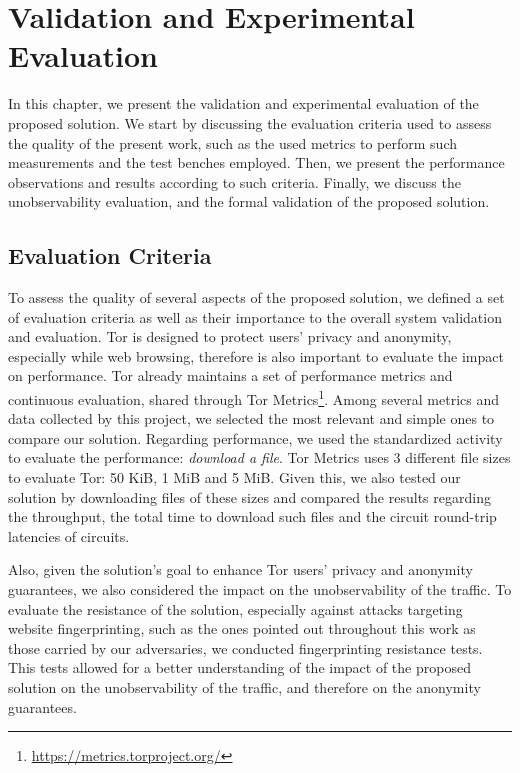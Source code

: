 
%

\chapter{Validation and Experimental Evaluation}\label{cha:validation}

In this chapter, we present the validation and experimental evaluation of the proposed solution. We start by discussing the evaluation criteria used to assess the quality of the present work, such as the used metrics to perform such measurements and the test benches employed. Then, we present the performance observations and results according to such criteria. 
Finally, we discuss the unobservability evaluation, and the formal validation of the proposed solution.

\section{Evaluation Criteria}\label{sec:evaluation_criteria}
To assess the quality of several aspects of the proposed solution, we defined a set of evaluation criteria as well as their importance to the overall system validation and evaluation. Tor is designed to protect users' privacy and anonymity, especially while web browsing, therefore is also important to evaluate the impact on performance. Tor already maintains a set of performance metrics and continuous evaluation, shared through Tor Metrics\footnote{\url{https://metrics.torproject.org/}}. Among several metrics and data collected by this project, we selected the most relevant and simple ones to compare our solution. Regarding performance, we used the standardized activity to evaluate the performance: \textit{download a file}. Tor Metrics uses 3 different file sizes to evaluate Tor: 50 KiB, 1 MiB and 5 MiB. Given this, we also tested our solution by downloading files of these sizes and compared the results regarding the throughput, the total time to download such files and the circuit round-trip latencies of circuits. 

Also, given the solution's goal to enhance Tor users' privacy and anonymity guarantees, we also considered the impact on the unobservability of the traffic. To evaluate the resistance of the solution, especially against attacks targeting website fingerprinting, such as the ones pointed out throughout this work as those carried by our adversaries, we conducted fingerprinting resistance tests. This tests allowed for a better understanding of the impact of the proposed solution on the unobservability of the traffic, and therefore on the anonymity guarantees. 

